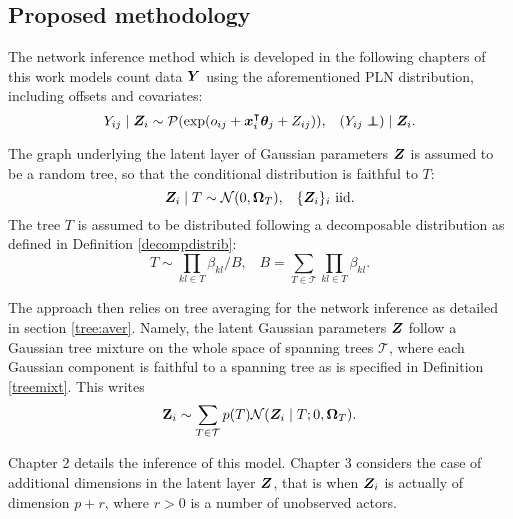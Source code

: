   \subsection{Proposed methodology}
 The network inference method which is developed in the following chapters of this work models count data ${\boldsymbol{Y}}$ using the aforementioned PLN distribution, including offsets and covariates:
 $$ Y_{ij}\mid \Zbf_i\sim \Pcal (\exp (o_{ij}+\xb_i^\intercal \thetab_j + Z_{ij})), \;\;\; (Y_{ij} \independent) \mid \Zbf_i .$$
 
The  graph underlying the latent layer of Gaussian parameters ${\boldsymbol{Z}}$ is assumed to be a random tree, so that the conditional distribution is faithful to $T$: 
 $${\boldsymbol{Z}}_i\mid T  \sim \mathcal{N} (0, {\boldsymbol{\Omega}}_T), \;\;\;  \{{\boldsymbol{Z}}_i\}_i \text{ iid}.$$
The tree $T$ is assumed to be distributed following a  decomposable distribution  as defined in Definition \ref{decompdistrib}:
 $$ T\sim \prod_{kl\in T} \beta_{kl} / B, \;\;\;  B= \sum_{T\in\mathcal{T}} \prod_{kl \in T} \beta_{kl}.$$
 

The approach then relies on tree averaging for the network inference as detailed in section \ref{tree:aver}. Namely, the latent Gaussian parameters ${\boldsymbol{Z}}$  follow a Gaussian tree mixture on the whole space of spanning trees $\mathcal{T}$, where each Gaussian component is faithful to a spanning tree as is specified in Definition \ref{treemixt}. This writes $${\bf Z}_i \sim \sum_{T\in \mathcal{T}} p(T) \mathcal{N} ({\boldsymbol{Z}}_i\mid T; 0, {\boldsymbol{\Omega}}_T).$$

Chapter 2 details the inference of this model. Chapter 3 considers  the case of additional dimensions in the latent layer ${\boldsymbol{Z}}$, that is when ${\boldsymbol{Z}}_i$ is actually of dimension $p+r$, where $r>0$ is a number of unobserved actors.
 

  